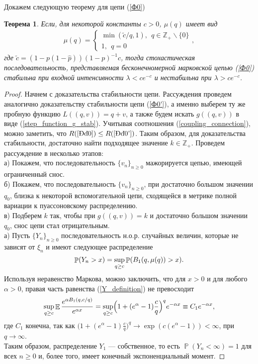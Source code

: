 \documentclass[10pt, reqno]{amsart}
\newtheorem*{theorem*}{Теорема}
\DeclareMathOperator*{\E}{\mathbb{E}}
\DeclareMathOperator*{\Pb}{\mathbb{P}}
\begin{document}
Докажем следующую теорему для цепи (\ref{Ф0})
\begin{theorem*}
Если, для некоторой константы $c > 0$, $\mu(q)$ имеет вид
\begin{align*}
    \mu(q) = \begin{cases}
    \min(\widetilde{c}/q, 1),\:\:q \in \mathbb{Z}_{+}\backslash\{0\}\\
    1,\:\: q = 0
    \end{cases},
\end{align*}
где $\widetilde{c} = (1 - p(1-\hat{p}))(1-p)^{-1}c$, тогда стохастическая последовательность, представляемая бесконечномерной марковской цепью (\ref{Ф0}) стабильна при входной интенсивности $\lambda < ce^{−c}$ и нестабильна при $\lambda > ce^{−c}$.
\end{theorem*}
\begin{proof}
Начнем с доказательства стабильности цепи. Рассуждения проведем аналогично доказательству стабильности цепи (\ref{Ф0'}), а именно выберем ту же пробную функцию $L((q, v)) = q + v$, а также будем искать $g((q, v))$ в виде (\ref{step_function_g_stab}). Учитывая соотношения (\ref{coupling_connection}), можно заметить, что $R(\ref{Ф0}) \leq R(\ref{Ф0'})$. Таким образом, для доказательства стабильности, достаточно найти подходящее значение $k \in \mathbb{Z}_{+}$. Проведем рассуждение в несколько этапов:\\
а) Покажем, что последовательность $\{v_{n}\}_{n \geq 0}$ мажорируется цепью, имеющей ограниченный снос.\\
б) Покажем, что последовательность $\{v_{n}\}_{n \geq 0}$, при достаточно большом значении $q_{0}$, близка к некоторой вспомогательной цепи, сходящейся в метрике полной вариации к пуассоновскому распределению.\\
в) Подберем $k$ так, чтобы при $g((q,v)) = k$ и достаточно большом значении $q_{0}$, снос цепи стал отрицательным.\\

а) Пусть $\{Y_{n}\}_{n \geq 0}$ последовательность н.о.р. случайных величин, которые не зависят от ${\xi_{n}}$ и имеют следующее распределение
\begin{equation}
    \Pb(Y_{n} > x) = \underset{q \geq c}{\rm sup}\Pb(B_{1}(q, \mu(q)) > x).
    \label{Y_definition}
\end{equation}
Используя неравенство Маркова, можно заключить, что для $x > 0$ и для любого $\alpha > 0$, правая часть равенства (\ref{Y_definition}) не превосходит
\begin{align*}
    \underset{q \geq c}{\rm sup}\E\frac{e^{\alpha B_{1}(q, c/q)}}{e^{\alpha x}} = \underset{q \geq c}{\rm sup}\Big(1 + (e^{\alpha} - 1)\frac{c}{q}\Big)^{q}e^{-\alpha x} \equiv C_{1}e^{-\alpha x},
\end{align*}
где $C_{1}$ конечна, так как $\Big(1 + (e^{\alpha} - 1)\frac{c}{q}\Big)^{q} \xrightarrow{} \exp(c(e^{\alpha}-1)) < \infty$, при $q \xrightarrow{} \infty$.
\\Таким образом, распределение $Y_{1}$ --- собственное, то есть $\Pb(Y_{n} < \infty) = 1$ для всех $n \geq 0$ и, более того, имеет конечный экспоненциальный момент.


\end{proof}
\end{document}
